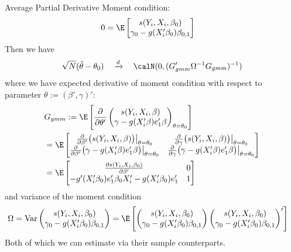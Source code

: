 \documentclass[handout]{beamer}
\newcommand{\Var}{\operatorname{Var}}
\newcommand{\dto}{\xrightarrow{d}}
\begin{document}
\begin{frame}[shrink]{Average Partial Derivative}
Moment condition:
\begin{align*}
    0
    &=
    \E
      \begin{bmatrix}
        s(Y_i,X_i,\beta_0)
        \\
        \gamma_0-g(X_i'\beta_0)\beta_{0,1}
      \end{bmatrix}
\end{align*}
Then we have
\begin{align*}
  \sqrt{N}(\hat{\theta}-\theta_0)
  \quad\dto\quad
  \calN(0,(G_{gmm}'\Omega^{-1}G_{gmm})^{-1})
\end{align*}
where we have expected derivative of moment condition with respect to
parameter $\theta:=(\beta',\gamma)'$:
\begin{align*}
  &
  G_{gmm}
  :=
  \E\left[
    \frac{\partial}{\partial \theta'}
    \begin{pmatrix}
      s(Y_i,X_i,\beta)
      \\
      \gamma-g(X_i'\beta)e_1'\beta
    \end{pmatrix}_{\theta=\theta_0}
  \right]
  \\
  &=
  \E
  \begin{bmatrix}
    \frac{\partial }{\partial \beta'}
    \big(s(Y_i,X_i,\beta)\big)\big|_{\theta=\theta_0}
    &
    \frac{\partial}{\partial \gamma}
    \big( s(Y_i,X_i,\beta)\big)\big|_{\theta=\theta_0}
    \\
    \frac{\partial}{\partial \beta'}
    \big(
    \gamma-g(X_i'\beta)e_1'\beta
    \big)
    \big|_{\theta=\theta_0}
    &
    \frac{\partial}{\partial \gamma}
    \big(
    \gamma-g(X_i'\beta)e_1'\beta
    \big)
    \big|_{\theta=\theta_0}
  \end{bmatrix}
  \\
  &=
  \E
  \begin{bmatrix}
    \frac{\partial s(Y_i,X_i,\beta_0)}{\partial \beta'}
    &
    0
    \\
    -g'(X_i'\beta_0)e_1'\beta_{0}X_i'
    -g(X_i'\beta_0)e_1'
    &
    1
  \end{bmatrix}
\end{align*}
and variance of the moment condition
\begin{align*}
  \Omega
  &=
  \Var
  \begin{pmatrix}
    s(Y_i,X_i,\beta_0)
    \\
    \gamma_0-g(X_i'\beta_0)\beta_{0,1}
  \end{pmatrix}
  =
  \E
  \left[
  \begin{pmatrix}
    s(Y_i,X_i,\beta_0)
    \\
    \gamma_0-g(X_i'\beta_0)\beta_{0,1}
  \end{pmatrix}
  \begin{pmatrix}
    s(Y_i,X_i,\beta_0)
    \\
    \gamma_0-g(X_i'\beta_0)\beta_{0,1}
  \end{pmatrix}'
  \right]
\end{align*}
Both of which we can estimate via their sample counterparts.
\end{frame}
\end{document}
